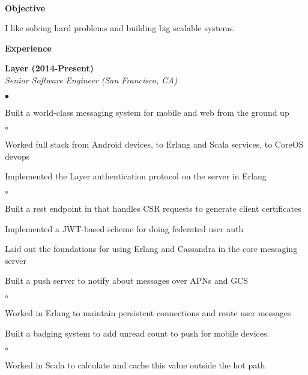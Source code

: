 \documentclass[ComputerScience]{vita}
\newenvironment{suber}[0]
{\begin{list}{$\bullet$}
	{\setlength{\topsep}{-0.4in}
		\setlength{\leftmargin}{0.25in}
		\setlength{\itemsep}{0.01in}}
}
{\end{list}\par}
\newenvironment{suberb}[0]
{\begin{list}{$\circ$}
	{\setlength{\topsep}{-0.4in}
		\setlength{\leftmargin}{0.25in}
		\setlength{\itemsep}{0.01in}}
}
{\end{list}\par}
\begin{document}
\topmargin=-1in
\title{}
\begin{vita}
\quad\\
{\bf {\large Objective}}\ \hrulefill
\begin{list}{}{\setlength{\leftmargin}{.25in}}
\item I like solving hard problems and building big scalable systems.
\end{list}
{\bf{\large Experience}}\ \hrulefill
\begin{list}{}{\setlength{\leftmargin}{.25in}}
    \item {\bf Layer (2014-Present)}\\
    {\em Senior Software Engineer (San Francisco, CA)}
    \begin{suber}
	\item Built a world-class messaging system for mobile and web from the ground up
		\begin{suberb}
			\item Worked full stack from Android devices, to Erlang and Scala services, to CoreOS devops
		\end{suberb}
    \item Implemented the Layer authentication protocol on the server in Erlang
		\begin{suberb}
			\item Built a rest endpoint in that handles CSR requests to generate client certificates
            \item Implemented a JWT-based scheme for doing federated user auth
		\end{suberb}
    \item Laid out the foundations for using Erlang and Cassandra in the core messaging server
    \item Built a push server to notify about messages over APNs and GCS
        \begin{suberb}
            \item Worked in Erlang to maintain persistent connections and route user messages
        \end{suberb}
    \item Built a badging system to add unread count to push for mobile devices.
        \begin{suberb}
            \item Worked in Scala to calculate and cache this value outside the hot path

\end{suberb}
\end{suber}
\end{list}
\end{vita}
\end{document}
